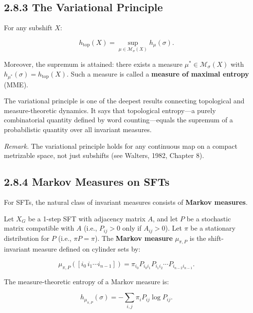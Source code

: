 \subsection{2.8.3 The Variational Principle}

\begin{theorem}
For any subshift $X$:

\[
h_{\mathrm{top}}(X) = \sup_{\mu \in \mathcal{M}_\sigma(X)} h_\mu(\sigma).
\]

Moreover, the supremum is attained: there exists a measure $\mu^* \in \mathcal{M}_\sigma(X)$ with $h_{\mu^*}(\sigma) = h_{\mathrm{top}}(X)$. Such a measure is called a \textbf{measure of maximal entropy} (MME).

The variational principle is one of the deepest results connecting topological and measure-theoretic dynamics. It says that topological entropy---a purely combinatorial quantity defined by word counting---equals the supremum of a probabilistic quantity over all invariant measures.

\textit{Remark.} The variational principle holds for any continuous map on a compact metrizable space, not just subshifts (see Walters, 1982, Chapter 8).
\end{theorem}

\subsection{2.8.4 Markov Measures on SFTs}

For SFTs, the natural class of invariant measures consists of \textbf{Markov measures}.

\begin{definition}
Let $X_G$ be a 1-step SFT with adjacency matrix $A$, and let $P$ be a stochastic matrix compatible with $A$ (i.e., $P_{ij} > 0$ only if $A_{ij} > 0$). Let $\pi$ be a stationary distribution for $P$ (i.e., $\pi P = \pi$). The \textbf{Markov measure} $\mu_{\pi, P}$ is the shift-invariant measure defined on cylinder sets by:

\[
\mu_{\pi, P}([i_0 \, i_1 \cdots i_{n-1}]) = \pi_{i_0} P_{i_0 i_1} P_{i_1 i_2} \cdots P_{i_{n-2} i_{n-1}}.
\]

The measure-theoretic entropy of a Markov measure is:

\[
h_{\mu_{\pi,P}}(\sigma) = -\sum_{i,j} \pi_i P_{ij} \log P_{ij}.
\]
\end{definition}

